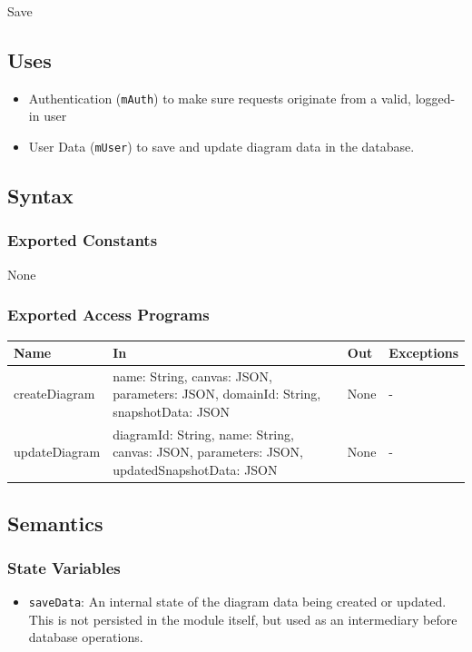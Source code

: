 \documentclass[12pt, titlepage]{article}
\begin{document}
Save

\subsection{Uses}
\begin{itemize}
  \item Authentication (\texttt{mAuth}) to make sure requests originate from a valid, logged-in user
  \item User Data (\texttt{mUser}) to save and update diagram data in the database.
\end{itemize}

\subsection{Syntax}

\subsubsection{Exported Constants}

None

\subsubsection{Exported Access Programs}

\begin{center}
\begin{tabular} {p{3cm} p{7cm} p{2cm} p{2cm}}
\hline
\textbf{Name} & \textbf{In} & \textbf{Out} & \textbf{Exceptions} \\
\hline
createDiagram & name: String, canvas: JSON, parameters: JSON, domainId: String, snapshotData: JSON & None & - \\
updateDiagram & diagramId: String, name: String, canvas: JSON, parameters: JSON, updatedSnapshotData: JSON & None & - \\
\hline
\end{tabular}
\end{center}

\subsection{Semantics}

\subsubsection{State Variables}

\begin{itemize}
  \item \texttt{saveData}: An internal state of the diagram data being created or updated. This is not persisted in the module itself, but used as an intermediary before database operations.
\end{itemize}
\end{document}
